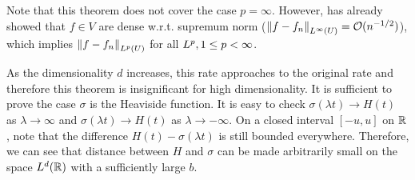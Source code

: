 
Note that this theorem does not cover the case $p = \infty$. However,
\cite{barronUniversalApproximationBounds1993} has already showed that $f\in V$
are dense w.r.t. supremum norm ($\left\| f - f_n \right\|_{L^{\infty}(U)} =
\mathcal{O}(n^{-1/2})$), which implies $\left\| f-f_n \right\|_{L^{p}(U)}$ for all $L^{p},
1 \leq p < \infty$.

As the dimensionality $d$ increases, this rate approaches to the original rate
and therefore this theorem is insignificant for high dimensionality. It is
sufficient to prove the case $\sigma$ is the Heaviside function. It is easy to
check $\sigma(\lambda t) \to H(t)$ as $\lambda \to \infty$ and $\sigma(\lambda
t) \to H(t)$ as $\lambda \to -\infty$. On a closed interval $[-u, u]$ on $\mathbb{R}$,
note that the difference $H(t) - \sigma(\lambda t)$ is still bounded everywhere.
Therefore, we can see that distance between $H$ and $\sigma$ can be made
arbitrarily small on the space $L^{d}(\mathbb{R})$ with a sufficiently large $b$.

